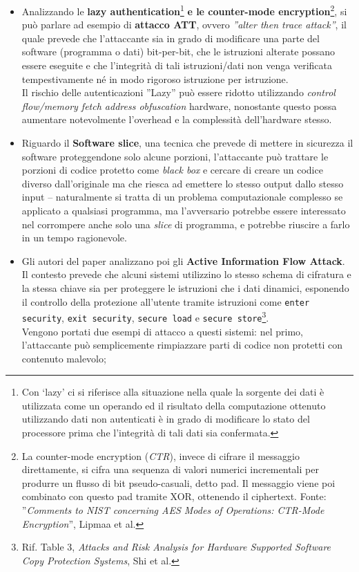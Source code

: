 \documentclass[a4paper,12pt]{article}
\begin{document}
\begin{itemize}
    \item Analizzando le \textbf{lazy authentication}\footnote{Con `lazy' ci si riferisce alla situazione nella quale la sorgente dei dati è utilizzata come un operando ed il risultato della computazione ottenuto utilizzando dati non autenticati è in grado di modificare lo stato del processore prima che l'integrità di 
    tali dati sia confermata.} \textbf{e le counter-mode encryption}\footnote{ La counter-mode encryption (\textit{CTR}), invece di cifrare il messaggio direttamente, si cifra una sequenza di valori numerici incrementali per produrre un flusso di bit pseudo-casuali, detto pad. Il messaggio viene poi combinato 
    con questo pad tramite XOR, ottenendo il ciphertext. Fonte: ''\textit{Comments to NIST concerning AES Modes of Operations: CTR-Mode Encryption}'', Lipmaa et al.}, si può parlare ad esempio di \textbf{attacco ATT}, ovvero \textit{''alter then trace attack''}, il quale prevede che l'attaccante sia in grado di modificare una parte del software 
    (programma o dati) bit-per-bit, che le istruzioni alterate possano essere eseguite e che l'integrità di tali istruzioni/dati non venga verificata tempestivamente né in modo rigoroso istruzione per istruzione.\\
    Il rischio delle autenticazioni ''Lazy'' può essere ridotto utilizzando \textit{control flow/memory fetch address obfuscation} hardware, nonostante questo possa aumentare notevolmente l'overhead e la complessità dell'hardware stesso.
    \item Riguardo il \textbf{Software slice}, una tecnica che prevede di mettere in sicurezza il software proteggendone solo alcune porzioni, l'attaccante può trattare le porzioni di codice protetto come \textit{black box} e cercare di creare un codice diverso dall'originale ma che riesca ad emettere lo stesso output dallo stesso input -- 
    naturalmente si tratta di un problema computazionale complesso se applicato a qualsiasi programma, ma l'avversario potrebbe essere interessato nel corrompere anche solo una \textit{slice} di programma, e potrebbe riuscire a farlo in un tempo ragionevole. 
    \item Gli autori del paper analizzano poi gli \textbf{Active Information Flow Attack}. Il contesto prevede che alcuni sistemi utilizzino lo stesso schema di cifratura e la stessa chiave sia per proteggere le istruzioni che i dati dinamici, esponendo il controllo della protezione all'utente tramite istruzioni come \texttt{enter security}, 
    \texttt{exit security}, \texttt{secure load} e \texttt{secure store}\footnote{Rif. Table 3, \textit{Attacks and Risk Analysis for Hardware Supported Software Copy Protection Systems}, Shi et al.}.\\ Vengono portati due esempi di attacco a questi sistemi: nel primo, l'attaccante può semplicemente rimpiazzare parti di codice non protetti con contenuto malevolo;

\end{itemize}
\end{document}

